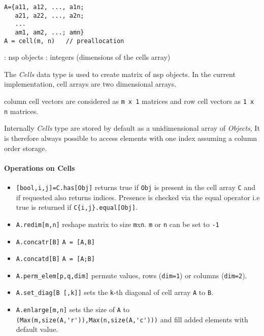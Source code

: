 
\begin{mandesc}
\end{mandesc}
\begin{calling_sequence}
\begin{verbatim}
A={a11, a12, ..., a1n;
   a21, a22, ..., a2n;
   ...
   am1, am2, ...; amn}
A = cell(m, n)   // preallocation
\end{verbatim}
\end{calling_sequence}
\begin{parameters}
  \begin{varlist}
    : nsp objects
    : integers (dimensions of the cells array)
  \end{varlist}
\end{parameters}

\begin{mandescription}

The \emph{Cells} data type is used to create matrix of nsp objects. 
In the current implementation, cell arrays are two dimensional arrays. 

column cell vectors are considered as \verb!m x 1! matrices and row cell vectors
as \verb!1 x n! matrices.

Internally \emph{Cells} type are stored by default as a unidimensional array of \emph{Objects},
It is therefore always possible to access elements with one index assuming a column order 
storage. 
\end{mandescription}

\paragraph{Operations on Cells}
\begin{itemize}
\item \verb+[bool,i,j]=C.has[Obj]+ returns true if \verb+Obj+ is present in the cell array \verb+C+ and if requested also returns indices. 
  Presence is checked via the equal operator i.e true is returned if \verb+C{i,j}.equal[Obj]+.
\end{itemize}
\begin{itemize}
\item \verb+A.redim[m,n]+ reshape matrix to size \verb+m+x\verb+n+. \verb+m+ or \verb+n+ can be set to \verb+-1+ 
\item \verb+A.concatr[B]+ \verb+A = [A,B]+
\item \verb+A.concatd[B]+ \verb+A = [A;B]+
\item \verb+A.perm_elem[p,q,dim]+ permute values, rows (\verb+dim=1+) or columns (\verb+dim=2+).
\item \verb+A.set_diag[B [,k]]+ sets the \verb+k+-th diagonal of cell array \verb+A+ to \verb+B+.
\item \verb+A.enlarge[m,n]+ sets the size of \verb+A+ to \verb+(Max(m,size(A,'r')),Max(n,size(A,'c')))+ and fill 
  added elements with default value.
\end{itemize}

